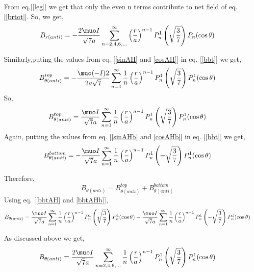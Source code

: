 From eq.[\ref{leg}] we get that only the even n terms contribute to net field of eq.[\ref{brtot}]. So, we get,
\begin{equation}\label{brtotAH}
B_{r(anti)}=-\frac{2 \muo I }{\sqrt{7}a}\sum_{n=2,4,6,...}^{\infty}
\left(\frac{r}{a}\right)^{n-1}P_n^1\left(\sqrt{\frac{3}{7}}\right) P_n(\cos\theta)
\end{equation}


Similarly,puting the values from eq. [\ref{sinAH} and \ref{cosAH}] in eq. [\ref{bbt}] we get,
$$B_{\theta(anti)}^{top}=-\frac{\muo (-I) 2}{2a\sqrt{7}}\sum_{n=1}^{\infty} \frac{1}{n}\left(\frac{r}{a}\right)^{n-1}P_n^1\left(\sqrt{\frac{3}{7}}\right) P_n^1(\cos\theta)$$
So,
\begin{equation}\label{bbtAH}
B_{\theta(anti)}^{top}=\frac{\muo I }{\sqrt{7}a}\sum_{n=1}^{\infty} \frac{1}{n}\left(\frac{r}{a}\right)^{n-1}P_n^1\left(\sqrt{\frac{3}{7}}\right) P_n^1(\cos\theta)
\end{equation}
Again, putting the values from eq. [\ref{sinAHb} and \ref{cosAHb}] in eq. [\ref{bbt}] we get,
\begin{equation}\label{bbtAHb}
B_{\theta(anti)}^{bottom}=-\frac{\muo I }{\sqrt{7}a}\sum_{n=1}^{\infty}\frac{1}{n} \left(\frac{r}{a}\right)^{n-1}P_n^1\left(-\sqrt{\frac{3}{7}}\right) P_n^1(\cos\theta)
\end{equation}


Therefore,
$$B_{\theta(anti)}=B_{\theta(anti)}^{top}+B_{\theta(anti)}^{bottom}$$
Using eq. [\ref{bbtAH} and \ref{bbtAHb}],
$$B_{\theta(anti)}=\frac{\muo I }{\sqrt{7}a}\sum_{n=1}^{\infty} \frac{1}{n}\left(\frac{r}{a}\right)^{n-1}P_n^1\left(\sqrt{\frac{3}{7}}\right) P_n^1(\cos\theta)-\frac{\muo I }{\sqrt{7}a}\sum_{n=1}^{\infty}\frac{1}{n} \left(\frac{r}{a}\right)^{n-1}P_n^1\left(-\sqrt{\frac{3}{7}}\right) P_n^1(\cos\theta)$$

As discussed above we get,
\begin{equation}\label{bttotAH}
B_{\theta(anti)}=\frac{2 \muo I }{\sqrt{7}a}\sum_{n=2,4,6,...}^{\infty}
\frac{1}{n}\left(\frac{r}{a}\right)^{n-1}P_n^1\left(\sqrt{\frac{3}{7}}\right) P_n^1(\cos\theta)
\end{equation}